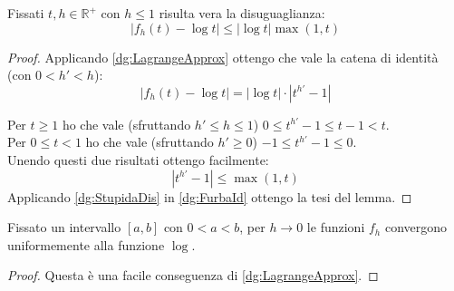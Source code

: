 \begin{lemma}\label{dg:DisEstremale}
	Fissati $t,h\in\mathbb{R^+}$ con $h\le1$ risulta vera la disuguaglianza:
	\begin{equation*}
		\left\lvert f_h(t)-\log{t}\right\rvert\le \left\lvert\log{t}\right\rvert\max(1,t)
	\end{equation*}
\end{lemma}
\begin{proof}
	Applicando \cref{dg:LagrangeApprox} ottengo che vale la catena di identità (con $0<h'<h$):
	\begin{equation}\label{dg:FurbaId}
		\left\lvert f_h(t)-\log{t}\right\rvert=\left\lvert\log{t}\right\rvert \cdot \left\lvert t^{h'}-1\right\rvert
	\end{equation}
	
	Per $t\ge 1$ ho che vale (sfruttando $h'\le h\le 1$) $0\le t^{h'}-1\le t-1<t$.\\
	Per $0\le t<1$ ho che vale (sfruttando $h'\ge0$) $-1\le t^{h'}-1\le 0$.\\
	Unendo questi due risultati ottengo facilmente:
	\begin{equation}\label{dg:StupidaDis}
		\left\lvert t^{h'}-1\right\rvert \le \max(1,t)
	\end{equation}
	Applicando \cref{dg:StupidaDis} in \cref{dg:FurbaId} ottengo la tesi del lemma.
\end{proof}

\begin{lemma}
	Fissato un intervallo $[a,b]$ con $0<a<b$, per $h\to 0$ le funzioni $f_h$ convergono uniformemente alla funzione $\log$.
\end{lemma}
\begin{proof}
	Questa è una facile conseguenza di \cref{dg:LagrangeApprox}.
\end{proof}


